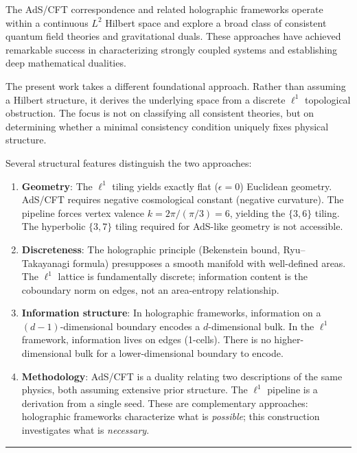 \documentclass[
]{article}
\begin{document}
The AdS/CFT correspondence and related holographic frameworks operate
within a continuous \(L^2\) Hilbert space and explore a broad class of
consistent quantum field theories and gravitational duals. These
approaches have achieved remarkable success in characterizing strongly
coupled systems and establishing deep mathematical dualities.

The present work takes a different foundational approach. Rather than
assuming a Hilbert structure, it derives the underlying space from a
discrete \(\ell^1\) topological obstruction. The focus is not on
classifying all consistent theories, but on determining whether a
minimal consistency condition uniquely fixes physical structure.

Several structural features distinguish the two approaches:

\begin{enumerate}
\def\labelenumi{\arabic{enumi}.}
\item
  \textbf{Geometry}: The \(\ell^1\) tiling yields exactly flat
  (\(\epsilon = 0\)) Euclidean geometry. AdS/CFT requires negative
  cosmological constant (negative curvature). The pipeline forces vertex
  valence \(k = 2\pi/(\pi/3) = 6\), yielding the \(\{3,6\}\) tiling. The
  hyperbolic \(\{3,7\}\) tiling required for AdS-like geometry is not
  accessible.
\item
  \textbf{Discreteness}: The holographic principle (Bekenstein bound,
  Ryu--Takayanagi formula) presupposes a smooth manifold with
  well-defined areas. The \(\ell^1\) lattice is fundamentally discrete;
  information content is the coboundary norm on edges, not an
  area-entropy relationship.
\item
  \textbf{Information structure}: In holographic frameworks, information
  on a \((d-1)\)-dimensional boundary encodes a \(d\)-dimensional bulk.
  In the \(\ell^1\) framework, information lives on edges (1-cells).
  There is no higher-dimensional bulk for a lower-dimensional boundary
  to encode.
\item
  \textbf{Methodology}: AdS/CFT is a duality relating two descriptions
  of the same physics, both assuming extensive prior structure. The
  \(\ell^1\) pipeline is a derivation from a single seed. These are
  complementary approaches: holographic frameworks characterize what is
  \emph{possible}; this construction investigates what is
  \emph{necessary}.
\end{enumerate}

\begin{center}\rule{0.5\linewidth}{0.5pt}\end{center}
\end{document}
